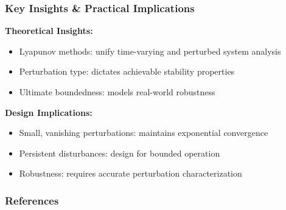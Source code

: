 \documentclass[student, noshadow, lsr, english, aspectratio=169, t]{ITR_LSR_slides}
\begin{document}
\begin{frame}
    \frametitle{Key Insights \& Practical Implications}

    \textbf{Theoretical Insights:}
    \begin{itemize}
        \setlength{\itemsep}{8pt}
        \item Lyapunov methods: unify time-varying and perturbed system analysis
        \item Perturbation type: dictates achievable stability properties
        \item Ultimate boundedness: models real-world robustness
    \end{itemize}

    \vspace{0.8cm}
    \textbf{Design Implications:}
    \begin{itemize}
        \setlength{\itemsep}{8pt}
        \item Small, vanishing perturbations: maintains exponential convergence
        \item Persistent disturbances: design for bounded operation
        \item Robustness: requires accurate perturbation characterization
    \end{itemize}
\end{frame}




\appendix

\begin{frame}[allowframebreaks]
    \frametitle{References}
    \nocite{*} 
    \printbibliography[heading=none]
\end{frame}
\end{document}
